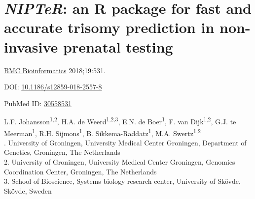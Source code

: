 \chapter[\textsl{NIPTeR}: an R package for NIPT analysis]{\textsl{NIPTeR}: an R package for fast and accurate trisomy prediction in non-invasive prenatal testing}
\label{chap:NIPTeR}

{ \Large {} }

\hfill \underline{BMC Bioinformatics} 2018;19:531.

\hfill DOI: \href{https://doi.org/10.1186/s12859-018-2557-8}{10.1186/s12859-018-2557-8}

\hfill PubMed ID: \href{https://www.ncbi.nlm.nih.gov/pubmed/30558531}{30558531}

\newpage

\noindent
L.F. Johansson\textsuperscript{1,2}, H.A. de Weerd\textsuperscript{1,2,3}, E.N. de Boer\textsuperscript{1}, F. van Dijk\textsuperscript{1,2}, G.J. te Meerman\textsuperscript{1}, R.H. Sijmons\textsuperscript{1}, B. Sikkema-Raddatz\textsuperscript{1}, M.A. Swertz\textsuperscript{1,2}\\

. University of Groningen, University Medical Center Groningen, Department of Genetics, Groningen, The Netherlands\\
2. University of Groningen, University Medical Center Groningen, Genomics Coordination Center, Groningen, The Netherlands\\
3. School of Bioscience, Systems biology research center, University of Skövde, Skövde, Sweden\\

